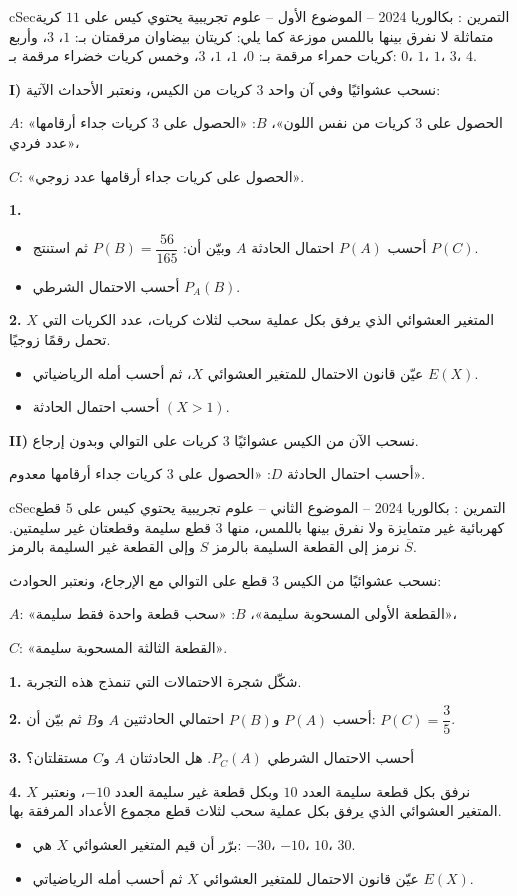 \documentclass[12pt,a4paper]{article}
\newenvironment{BOX}[2]{\begin{otherlanguage}{english}\begin{arbox}{#1}{#2}}{\end{arbox}\end{otherlanguage}}
\newcounter{exo}
\newenvironment{tamrin}[1]{\stepcounter{exo}\begin{BOX}{cSec}{التمرين \theexo: #1}}{\end{BOX}}
\newenvironment{sq}{\begin{itemize}[leftmargin=2.4em,itemsep=3pt]}{\end{itemize}}
\newcommand{\qa}{\item[(أ)]}\newcommand{\qb}{\item[(ب)]}\newcommand{\qc}{\item[(جـ)]}\newcommand{\qd}{\item[(د)]}\newcommand{\qe}{\item[(هـ)]}
\newcommand{\QQ}[1]{\par\smallskip\textbf{#1.} }
\begin{document}
\begin{tamrin}{بكالوريا 2024 -- الموضوع الأول -- علوم تجريبية}
يحتوي كيس على $11$ كرية متماثلة لا نفرق بينها باللمس موزعة كما يلي: كريتان بيضاوان مرقمتان بـ: $1$، $3$، وأربع كريات حمراء مرقمة بـ: $0$، $1$، $1$، $3$، وخمس كريات خضراء مرقمة بـ: $0$، $1$، $1$، $3$، $4$.

\textbf{I)} نسحب عشوائيًا وفي آن واحد $3$ كريات من الكيس، ونعتبر الأحداث الآتية:

$A$: «الحصول على $3$ كريات من نفس اللون»، \quad $B$: «الحصول على $3$ كريات جداء أرقامها عدد فردي»،

$C$: «الحصول على كريات جداء أرقامها عدد زوجي».
\QQ{1}
\begin{sq}
\qa أحسب $P(A)$ احتمال الحادثة $A$ وبيّن أن: $P(B)=\dfrac{56}{165}$ ثم استنتج $P(C)$.
\qb أحسب الاحتمال الشرطي $P_A(B)$.
\end{sq}
\QQ{2} $X$ المتغير العشوائي الذي يرفق بكل عملية سحب لثلاث كريات، عدد الكريات التي تحمل رقمًا زوجيًا.
\begin{sq}
\qa عيّن قانون الاحتمال للمتغير العشوائي $X$، ثم أحسب أمله الرياضياتي $E(X)$.
\qb أحسب احتمال الحادثة $(X>1)$.
\end{sq}
\textbf{II)} نسحب الآن من الكيس عشوائيًا $3$ كريات على التوالي وبدون إرجاع.

أحسب احتمال الحادثة $D$: «الحصول على $3$ كريات جداء أرقامها معدوم».
\end{tamrin}

\begin{tamrin}{بكالوريا 2024 -- الموضوع الثاني -- علوم تجريبية}
يحتوي كيس على $5$ قطع كهربائية غير متمايزة ولا نفرق بينها باللمس، منها $3$ قطع سليمة وقطعتان غير سليمتين.
نرمز إلى القطعة السليمة بالرمز $S$ وإلى القطعة غير السليمة بالرمز $\overline{S}$.

نسحب عشوائيًا من الكيس $3$ قطع على التوالي مع الإرجاع، ونعتبر الحوادث:

$A$: «القطعة الأولى المسحوبة سليمة»، \quad $B$: «سحب قطعة واحدة فقط سليمة»،

$C$: «القطعة الثالثة المسحوبة سليمة».
\QQ{1} شكّل شجرة الاحتمالات التي تنمذج هذه التجربة.
\QQ{2} أحسب $P(A)$ و$P(B)$ احتمالي الحادثتين $A$ و$B$ ثم بيّن أن: $P(C)=\dfrac35$.
\QQ{3} أحسب الاحتمال الشرطي $P_C(A)$. هل الحادثتان $A$ و$C$ مستقلتان؟
\QQ{4} نرفق بكل قطعة سليمة العدد $10$ وبكل قطعة غير سليمة العدد $-10$، ونعتبر $X$ المتغير العشوائي الذي يرفق بكل عملية سحب لثلاث قطع مجموع الأعداد المرفقة بها.
\begin{sq}
\qa برّر أن قيم المتغير العشوائي $X$ هي: $-30$، $-10$، $10$، $30$.
\qb عيّن قانون الاحتمال للمتغير العشوائي $X$ ثم أحسب أمله الرياضياتي $E(X)$.
\end{sq}
\end{tamrin}
\end{document}
